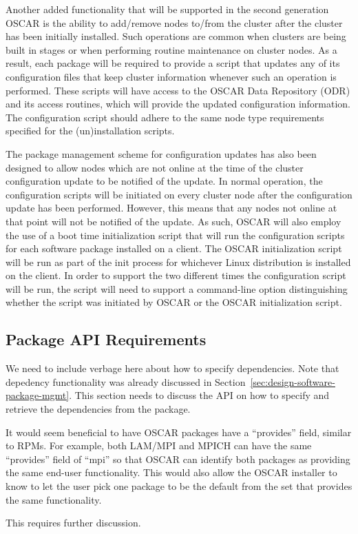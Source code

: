 Another added functionality that will be supported in the second
generation OSCAR is the ability to add/remove nodes to/from the
cluster after the cluster has been initially installed. Such
operations are common when clusters are being built in stages or when
performing routine maintenance on cluster nodes. As a result, each
package will be required to provide a script that updates any of its
configuration files that keep cluster information whenever such an
operation is performed. These scripts will have access to the OSCAR
Data Repository (ODR) and its access routines, which will provide the
updated configuration information. The configuration script should
adhere to the same node type requirements specified for the
(un)installation scripts.

The package management scheme for configuration updates has also been
designed to allow nodes which are not online at the time of the
cluster configuration update to be notified of the update. In normal
operation, the configuration scripts will be initiated on every
cluster node after the configuration update has been
performed. However, this means that any nodes not online at that point
will not be notified of the update. As such, OSCAR will also employ
the use of a boot time initialization script that will run the
configuration scripts for each software package installed on a
client. The OSCAR initialization script will be run as part of the
init process for whichever Linux distribution is installed on the
client. In order to support the two different times the configuration
script will be run, the script will need to support a command-line
option distinguishing whether the script was initiated by OSCAR or the
OSCAR initialization script.

\subsection{Package API Requirements}

\begin{discuss}
  We need to include verbage here about how to specify dependencies.
  Note that depedency functionality was already discussed in
  Section~\ref{sec:design-software-package-mgmt}.  This section needs
  to discuss the API on how to specify and retrieve the dependencies
  from the package.
\end{discuss}

\begin{discuss}
  It would seem beneficial to have OSCAR packages have a ``provides''
  field, similar to RPMs.  For example, both LAM/MPI and MPICH can
  have the same ``provides'' field of ``mpi'' so that OSCAR can
  identify both packages as providing the same end-user functionality.
  This would also allow the OSCAR installer to know to let the user
  pick one package to be the default from the set that provides the
  same functionality.

  This requires further discussion.
\end{discuss}

